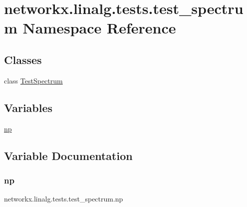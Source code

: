 \hypertarget{namespacenetworkx_1_1linalg_1_1tests_1_1test__spectrum}{}\section{networkx.\+linalg.\+tests.\+test\+\_\+spectrum Namespace Reference}
\label{namespacenetworkx_1_1linalg_1_1tests_1_1test__spectrum}
\subsection*{Classes}
\begin{DoxyCompactItemize}
\item 
class \hyperlink{classnetworkx_1_1linalg_1_1tests_1_1test__spectrum_1_1TestSpectrum}{Test\+Spectrum}
\end{DoxyCompactItemize}
\subsection*{Variables}
\begin{DoxyCompactItemize}
\item 
\hyperlink{namespacenetworkx_1_1linalg_1_1tests_1_1test__spectrum_ace4fc84f61d0259e8af4ed269b37ed1b}{np}
\end{DoxyCompactItemize}


\subsection{Variable Documentation}
\mbox{\label{namespacenetworkx_1_1linalg_1_1tests_1_1test__spectrum_ace4fc84f61d0259e8af4ed269b37ed1b}} 
\subsubsection{\texorpdfstring{np}{np}}
{\footnotesize\ttfamily networkx.\+linalg.\+tests.\+test\+\_\+spectrum.\+np}

